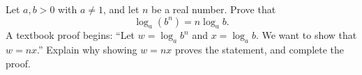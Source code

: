 Let $a,b>0$ with $a\ne1$, and let $n$ be a real number. Prove that
\[\log_a\left(b^n\right)=n\log_ab .\]
A textbook proof begins: ``Let $w=\log_a b^n$ and $x=\log_ab$. We want to show that $w=nx$.'' Explain why showing $w=nx$ proves the statement, and complete the proof.

